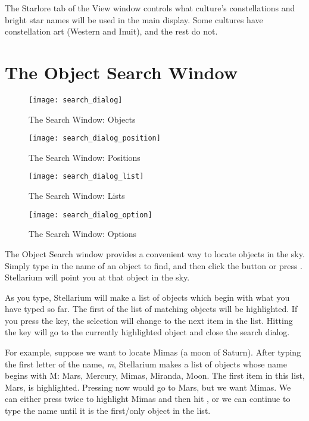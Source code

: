 The Starlore tab of the View window controls what culture's
constellations and bright star names will be used in the main display.
Some cultures have constellation art (Western and Inuit), and the rest
do not.


\section{The Object Search Window}
\label{sec:gui:search}

\begin{figure}[p]
\centering\texttt{[image: search\_dialog]}
\caption{The Search Window: Objects}
\label{fig:gui:search}
\end{figure}

\begin{figure}[p]
\centering\texttt{[image: search\_dialog\_position]}
\caption{The Search Window: Positions}
\label{fig:gui:search:position}
\end{figure}

\begin{figure}[p]
\centering\texttt{[image: search\_dialog\_list]}
\caption{The Search Window: Lists}
\label{fig:gui:search:position}
\end{figure}


\begin{figure}[p]
\centering\texttt{[image: search\_dialog\_option]}
\caption{The Search Window: Options}
\label{fig:gui:search:options}
\end{figure}

The Object Search window provides a convenient way to locate objects in
the sky. Simply type in the name of an object to find, and then click
the  button or press \key{\return}. Stellarium will point you at that
object in the sky.

As you type, Stellarium will make a list of objects which begin with
what you have typed so far. The first of the list of matching objects
will be highlighted. If you press the \key{\tab} key, the selection will change
to the next item in the list. Hitting the \key{\return} key will go to the
currently highlighted object and close the search dialog.

For example, suppose we want to locate Mimas (a moon of Saturn). After
typing the first letter of the name, \emph{m}, Stellarium makes a list
of objects whose name begins with M: Mars, Mercury, Mimas, Miranda,
Moon. The first item in this list, Mars, is highlighted. Pressing \key{\return}
now would go to Mars, but we want Mimas. We can either press \key{\tab} twice
to highlight Mimas and then hit \key{\return}, or we can continue to type the
name until it is the first/only object in the list.


